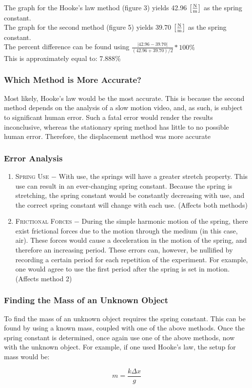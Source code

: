 \documentclass{article}
\begin{document}
The graph for the Hooke's law method (figure 3) yields 42.96 $\left[\si{\frac{\newton}{\meter}}\right]$ as the spring constant.\\
The graph for the second method (figure 5) yields 39.70 $\left[\si{\frac{\newton}{\meter}}\right]$ as the spring constant.\\

\flushleft The percent difference can be found using $\frac{|42.96-39.70|}{(42.96 + 39.70)/2} * 100\%$\\
This is approximately equal to: 7.888\%


\subsubsection{Which Method is More Accurate?}

Most likely, Hooke's law would be the most accurate. This is because the second method depends on the analysis of a slow motion video, and, as such, is subject to significant human error. Such a fatal error would render the results inconclusive, whereas the stationary spring method has little to no possible human error. Therefore, the displacement method was more accurate


\subsubsection{Error Analysis}
\begin{enumerate}

    \item \textsc{Spring Use} $-$ With use, the springs will have a greater stretch property. This use can result in an ever-changing spring constant. Because the spring is stretching, the spring constant would be constantly decreasing with use, and the correct spring constant will change with each use. (Affects both methods)
    
    \item \textsc{Frictional Forces} $-$ During the simple harmonic motion of the spring, there exist frictional forces due to the motion through the medium (in this case, air). These forces would cause a deceleration in the motion of the spring, and therefore an increasing period. These errors can, however, be nullified by recording a certain period for each repetition of the experiment. For example, one would agree to use the first period after the spring is set in motion. (Affects method 2)
    
\end{enumerate}

\subsubsection{Finding the Mass of an Unknown Object}

To find the mass of an unknown object requires the spring constant. This can be found by using a known mass, coupled with one of the above methods. Once the spring constant is determined, once again use one of the above methods, now with the unknown object. For example, if one used Hooke's law, the setup for mass would be:

$$m = \frac{k\Delta x}{g}$$
\end{document}
